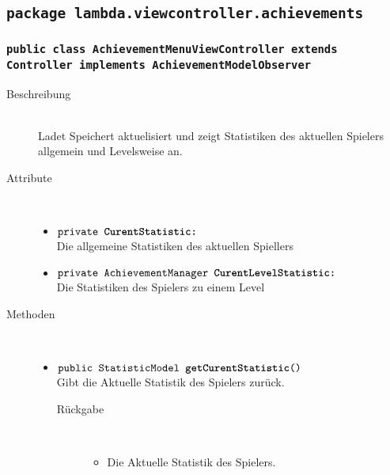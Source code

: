 \subsection{\texttt{package lambda.viewcontroller.achievements}}

\subsubsection{\normalfont \texttt{public class \textbf{AchievementMenuViewController} extends Controller implements AchievementModelObserver}}

\begin{description}
\item[Beschreibung] \hfill \\Ladet Speichert aktuelisiert und zeigt  Statistiken des aktuellen Spielers allgemein und Levelsweise an.  
\item[Attribute] \hfill \\
	\vspace{-.8cm}
	\begin{itemize}
		\item $\texttt{private  \textbf{CurentStatistic:}}$ \\ Die allgemeine Statistiken des aktuellen Spiellers
		\item $\texttt{private AchievementManager \textbf{CurentLevelStatistic:}}$ \\ Die Statistiken des Spielers zu einem  Level
	\end{itemize}
	
\item[Methoden] \hfill \\
	\vspace{-.8cm}
	\begin{itemize}
		\item $\texttt{public StatisticModel \textbf{getCurentStatistic}()}$ \\ Gibt die Aktuelle Statistik des Spielers zurück.
				\begin{description}
					\item[Rückgabe] \hfill \\
					\vspace{-.8cm}
					\begin{itemize}
						\item Die Aktuelle Statistik des Spielers.
					\end{itemize}
				\end{description}
				

\end{itemize}
\end{description}
